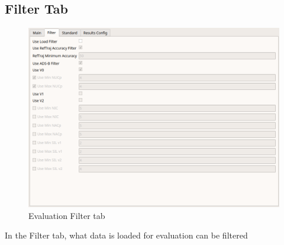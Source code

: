 \subsection{Filter Tab}

\begin{figure}[H]
  \hspace*{-2cm}
    \includegraphics[width=18cm,frame]{figures/eval_filter.png}
  \caption{Evaluation Filter tab}
\end{figure}

In the Filter tab, what data is loaded for evaluation can be filtered \\

